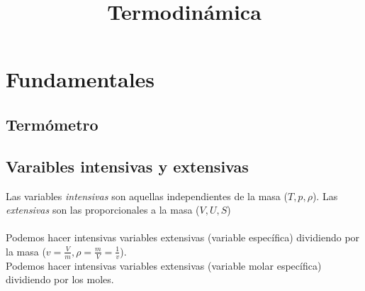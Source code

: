 \documentclass[leqno]{article}
\title{Termodinámica}
\begin{document}
\maketitle
\tableofcontents
\newpage

\section{Fundamentales}

\subsection{Termómetro}

\subsection{Varaibles intensivas y extensivas}
Las variables \textit{intensivas} son aquellas independientes de la masa ($T, p, \rho$).
Las \textit{extensivas} son las proporcionales a la masa ($V, U, S$) \\
\\
Podemos hacer intensivas variables extensivas (variable específica) dividiendo por la masa ($v = \frac{V}{m}, \rho = \frac{m}{V} = \frac{1}{v}$). \\
Podemos hacer intensivas variables extensivas (variable molar específica) dividiendo por los moles.
\end{document}
